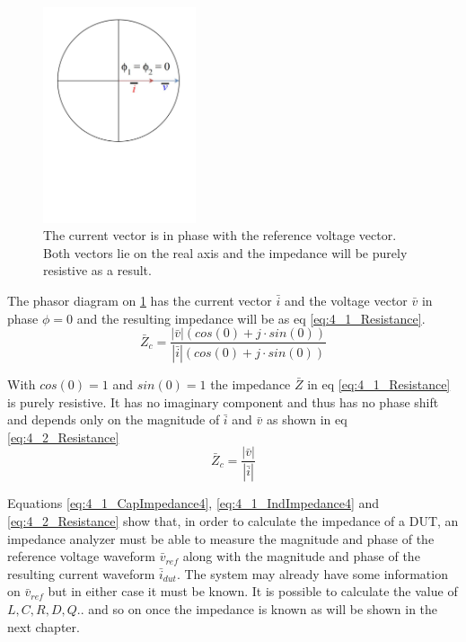 \begin{figure}[H]
    \centering
    \includegraphics[clip, trim=0 275 0 0, width=0.4\textwidth]{Sections/4_TechnicalAnalysis/Figures/4_1_ResPhasor.pdf}
    \caption{The current vector is in phase with the reference voltage vector. Both vectors lie on the real axis and the impedance will be purely resistive as a result.}
    \label{fig:4_1_ResImpedance}
\end{figure}

The phasor diagram on \ref{fig:4_1_ResImpedance} has the current vector $\bar i$ and the voltage vector $\bar v$ in phase $\phi = 0$ and 
the resulting impedance will be as eq \ref{eq:4_1_Resistance}.
\begin{equation}\label{eq:4_1_Resistance}
    \bar Z_c = \frac{|\bar v| (cos(0) +j\cdot sin(0))}{|\bar i| (cos(0) +j\cdot sin(0))}
\end{equation}

With $cos(0) = 1$ and  $sin(0) = 1$ the impedance $\bar Z$ in eq \ref{eq:4_1_Resistance} is purely resistive. It has no imaginary component and thus has no phase shift and depends only on the magnitude of $\bar i$ and $\bar v$ as shown in eq \ref{eq:4_2_Resistance}
\begin{equation}\label{eq:4_2_Resistance}
    \bar Z_c = \frac{|\bar v|}{|\bar i|}
\end{equation}

Equations \ref{eq:4_1_CapImpedance4}, \ref{eq:4_1_IndImpedance4} and \ref{eq:4_2_Resistance} show that, in order to calculate the impedance of a DUT, an impedance analyzer must be able to measure the magnitude and phase of the reference voltage waveform $\bar v_{ref}$ along with the magnitude and phase of the resulting current waveform $\bar i_{dut}$. The system may already have some information on $\bar v_{ref}$ but in either case it must be known. It is possible to calculate the value of $L, C, R, D, Q..$ and so on once the impedance is known as will be shown in the next chapter.


